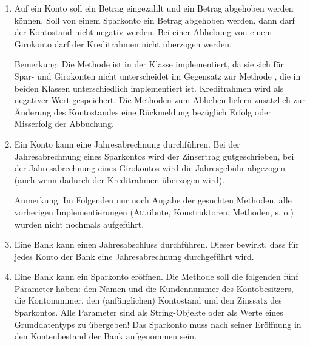\documentclass{lehramt-informatik-aufgabe}
\begin{document}
\begin{enumerate}
\item Auf ein Konto soll ein Betrag eingezahlt und ein Betrag abgehoben
werden können. Soll von einem Sparkonto ein Betrag abgehoben werden,
dann darf der Kontostand nicht negativ werden. Bei einer Abhebung von
einem Girokonto darf der Kreditrahmen nicht überzogen werden.

\begin{liAntwort}
Bemerkung: Die Methode  ist in der Klasse 
implementiert, da sie sich für Spar- und Girokonten nicht unterscheidet
im Gegensatz zur Methode , die in beiden Klassen
unterschiedlich implementiert ist.  Kreditrahmen wird als negativer Wert
gespeichert. Die Methoden zum Abheben liefern zusätzlich zur Änderung
des Kontostandes eine Rückmeldung bezüglich Erfolg oder Misserfolg der
Abbuchung.
\end{liAntwort}


\item Ein Konto kann eine Jahresabrechnung durchführen. Bei der
Jahresabrechnung eines Sparkontos wird der Zinsertrag gutgeschrieben,
bei der Jahresabrechnung eines Girokontos wird die Jahresgebühr
abgezogen (auch wenn dadurch der Kreditrahmen überzogen wird).

\begin{liAntwort}
Anmerkung: Im Folgenden nur noch Angabe der gesuchten Methoden, alle
vorherigen Implementierungen (Attribute, Konstruktoren, Methoden, s. o.)
wurden nicht nochmals aufgeführt.
\end{liAntwort}


\item Eine Bank kann einen Jahresabschluss durchführen. Dieser bewirkt,
dass für jedes Konto der Bank eine Jahresabrechnung durchgeführt wird.


\item Eine Bank kann ein Sparkonto eröffnen. Die Methode soll die
folgenden fünf Parameter haben: den Namen und die Kundennummer des
Kontobesitzers, die Kontonummer, den (anfänglichen) Kontostand und den
Zinssatz des Sparkontos. Alle Parameter sind als String-Objekte oder als
Werte eines Grunddatentyps zu übergeben! Das Sparkonto muss nach seiner
Eröffnung in den Kontenbestand der Bank aufgenommen sein.


\end{enumerate}
\end{document}

